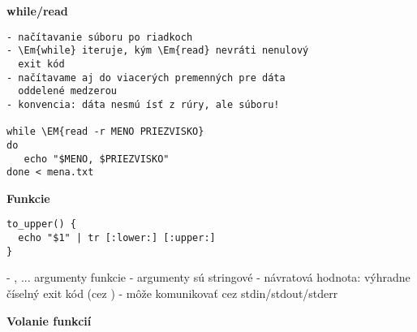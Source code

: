 \documentclass[8pt,landscape]{extarticle}
\newcommand{\Heading}[1]{%
{\begin{center}\bfseries\Large#1\end{center}}%
}%
\newcommand{\Em}[1]{\Ovalbox{#1}}
\newcommand{\EM}[1]{\fbox{#1}}
\newenvironment{karticka}[1]%
{%
\Heading{#1}%
}%
{%
\clearpage
}%
\begin{document}
\newpage
\Heading{while/read}
\begin{Verbatim}[commandchars=\\\{\}]
- načítavanie súboru po riadkoch
- \Em{while} iteruje, kým \Em{read} nevráti nenulový 
  exit kód
- načítavame aj do viacerých premenných pre dáta
  oddelené medzerou
- konvencia: dáta nesmú ísť z rúry, ale súboru!

while \EM{read -r MENO PRIEZVISKO}
do
   echo "$MENO, $PRIEZVISKO"
done < mena.txt
\end{Verbatim}
\begin{karticka}{Funkcie}
\begin{Verbatim}
to_upper() {
  echo "$1" | tr [:lower:] [:upper:]
}
\end{Verbatim}
\begin{obsah}
- \Em{$1}, \Em{$2}... argumenty funkcie
- argumenty sú stringové
- návratová hodnota: výhradne číselný exit kód 
  (cez \Em{return})
- môže komunikovať cez stdin/stdout/stderr
\end{obsah}
\end{karticka}

\begin{karticka}{Volanie funkcií}
\end{karticka}
\end{document}
